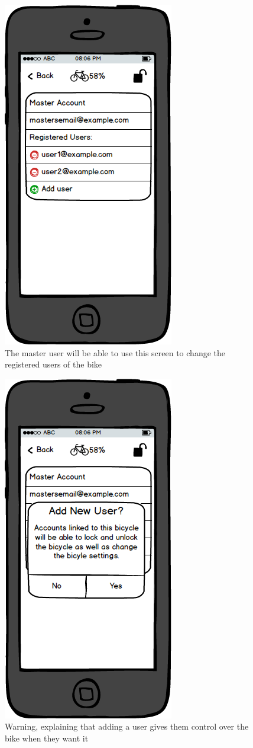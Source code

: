 \documentclass[a4paper]{report}
\begin{document}
\clearpage
\begin{figure}
\centering
\includegraphics[scale=0.9]{figures/prototype_2/accounts}
\caption{The master user will be able to use this screen to change the registered users of the bike}
\end{figure}
\clearpage
\begin{figure}
\centering
\includegraphics[scale=0.9]{figures/prototype_2/add_user_warn}
\caption{Warning, explaining that adding a user gives them control over the bike when they want it}
\end{figure}
\end{document}
